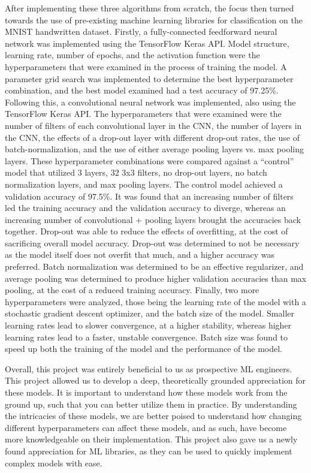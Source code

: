\documentclass[a4paper]{article}
\begin{document}
After implementing these three algorithms from scratch, the focus then turned towards the use of pre-existing machine learning libraries for classification on the MNIST handwritten dataset. Firstly, a fully-connected feedforward neural network was implemented using the TensorFlow Keras API. Model structure, learning rate, number of epochs, and the activation function were the hyperparameters that were examined in the process of training the model. A parameter grid search was implemented to determine the best hyperparameter combination, and the best model examined had a test accuracy of 97.25\%. Following this, a convolutional neural network was implemented, also using the TensorFlow Keras API. The hyperparameters that were examined were the number of filters of each convolutional layer in the CNN, the number of layers in the CNN, the effects of a drop-out layer with different drop-out rates, the use of batch-normalization, and the use of either average pooling layers vs. max pooling layers. These hyperparameter combinations were compared against a ``control'' model that utilized 3 layers, 32 3x3 filters, no drop-out layers, no batch normalization layers, and max pooling layers. The control model achieved a validation accuracy of 97.5\%. It was found that an increasing number of filters led the training accuracy and the validation accuracy to diverge, whereas an increasing number of convolutional + pooling layers brought the accuracies back together. Drop-out was able to reduce the effects of overfitting, at the cost of sacrificing overall model accuracy. Drop-out was determined to not be necessary as the model itself does not overfit that much, and a higher accuracy was preferred. Batch normalization was determined to be an effective regularizer, and average pooling was determined to produce higher validation accuracies than max pooling, at the cost of a reduced training accuracy. Finally, two more hyperparameters were analyzed, those being the learning rate of the model with a stochastic gradient descent optimizer, and the batch size of the model. Smaller learning rates lead to slower convergence, at a higher stability, whereas higher learning rates lead to a faster, unstable convergence. Batch size was found to speed up both the training of the model and the performance of the model.

Overall, this project was entirely beneficial to us as prospective ML engineers. This project allowed us to develop a deep, theoretically grounded appreciation for these models. It is important to understand how these models work from the ground up, such that you can better utilize them in practice. By understanding the intricacies of these models, we are better poised to understand how changing different hyperparameters can affect these models, and as such, have become more knowledgeable on their implementation. This project also gave us a newly found appreciation for ML libraries, as they can be used to quickly implement complex models with ease. 
\end{document}

